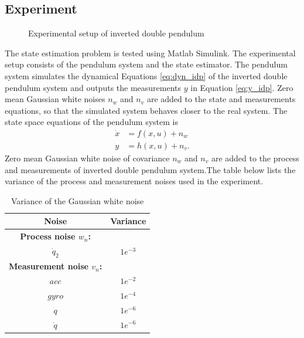 \subsection{Experiment}
\begin{figure}[h]
    \centering
    
    \caption{Experimental setup of inverted double pendulum}
    \label{fig:exp_idp}  
\end{figure}

The state estimation problem is tested using Matlab Simulink. The experimental setup consists of the pendulum system and the state estimator. The pendulum system simulates the dynamical Equations \ref{eq:dyn_idp} of the inverted double pendulum system and outputs the measurements $y$ in Equation \ref{eq:y_idp}. Zero mean Gaussian white noises $n_w$ and $n_v$ are added to the state and measurements equations, so that the simulated system behaves closer to the real system. The state space equations of the pendulum system is 
\begin{equation}
    \label{eq:sim_idp}
    \begin{split}
    \dot x &= f(x,u) + n_w \\
    y &= h(x,u) + n_v.
    \end{split}
\end{equation}
Zero mean Gaussian white noise of covariance $n_w$ and $n_v$ are added to the process and measurements of inverted double pendulum system.The table below lists the variance of the process and measurement noises used in the experiment.
\begin{table}[H]
    \centering
    \begin{tabular}{|c|c|}
    \hline
    Noise &Variance\\ \hline
    \textbf{Process noise $w_n$:}&\hspace{2mm} \\
    $\dot q_2$ &$1e^{-3}$ \\ \hline
    \textbf{Measurement noise $v_n$:}&\hspace{2mm} \\
     $acc$ &$1e^{-2}$ \\
     $gyro$ &$1e^{-4}$ \\
     $q$ &$1e^{-6}$\\ 
     $\dot q$ &$1e^{-6}$ \\ \hline
    \end{tabular}
    \caption{ Variance of the Gaussian white noise}
    \label{tab:idp_noise}
\end{table}

